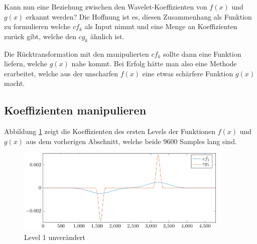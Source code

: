 Kann nun eine Beziehung zwischen den Wavelet-Koeffizienten von $f(x)$ und $g(x)$ erkannt werden?
Die Hoffnung ist es, diesen Zusammenhang als Funktion zu formulieren welche $cf_k$ als Input nimmt und eine Menge an Koeffizienten zurück gibt, welche den $cg_k$ ähnlich ist.

Die Rücktransformation mit den manipulierten $cf_k$ sollte dann eine Funktion liefern, welche $g(x)$ nahe kommt.
Bei Erfolg hätte man also eine Methode erarbeitet, welche aus der \glqq unscharfen\grqq{} $f(x)$ eine etwas \glqq schärfere\grqq{} Funktion $g(x)$ macht. 

\subsection{Koeffizienten manipulieren}
Abbildung \ref{deconvolve:level1} zeigt die Koeffizienten des ersten Levels der Funktionen $f(x)$ und $g(x)$ aus dem vorherigen Abschnitt, welche beide 9600 Samples lang sind.
\begin{figure}[h]
\centering
\includegraphics[width=0.9\textwidth]{./papers/deconvolve/pictures/level/level1.pdf}
\caption{Level 1 unverändert\label{deconvolve:level1}}
\end{figure}


